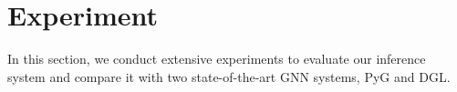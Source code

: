 \documentclass[conference]{IEEEtran}
\begin{document}




\section{Experiment}
In this section, we conduct extensive experiments to evaluate our inference system and compare it with two state-of-the-art GNN systems, PyG\cite{b15} and DGL\cite{b13}.
\end{document}
